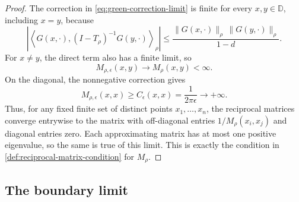 \begin{proof}
The correction in \eqref{eq:green-correction-limit} is finite
for every $x,y\in\mathbb D$, including $x=y$, because
\begin{equation}\label{eq:green-correction-bound}
 \left|\left\langle G(x,\cdot),(I-T_\rho)^{-1}G(y,\cdot)
 \right\rangle_\rho\right|
 \le\frac{\|G(x,\cdot)\|_\rho\,\|G(y,\cdot)\|_\rho}{1-d}.
\end{equation}
For $x\ne y$, the direct term also has a finite limit, so
\[
 M_{\rho,\epsilon}(x,y)\longrightarrow M_\rho(x,y)<\infty.
\]
On the diagonal, the nonnegative correction gives
\[
 M_{\rho,\epsilon}(x,x)\ge C_\epsilon(x,x)
 =\frac1{2\pi\epsilon}\longrightarrow+\infty.
\]
Thus, for any fixed finite set of distinct points $x_1,\ldots,x_n$,
the reciprocal matrices converge entrywise to the matrix with
off-diagonal entries $1/M_\rho(x_i,x_j)$ and diagonal entries zero.
Each approximating matrix has at most one positive eigenvalue,
so the same is true of this limit. This is exactly
the condition in \cref{def:reciprocal-matrix-condition} for $M_\rho$.
\end{proof}

\subsection{The boundary limit}

